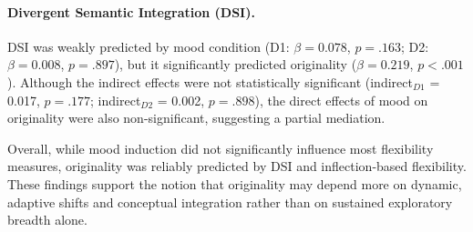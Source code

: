 \documentclass[../MA_Thesis.tex]{subfiles}
\begin{document}
\paragraph{Divergent Semantic Integration (DSI).}
DSI was weakly predicted by mood condition (D1: $\beta = 0.078$, $p = .163$; D2: $\beta = 0.008$, $p = .897$), but it significantly predicted originality ($\beta = 0.219$, $p < .001$). Although the indirect effects were not statistically significant (indirect$_{D1}$ = 0.017, $p = .177$; indirect$_{D2}$ = 0.002, $p = .898$), the direct effects of mood on originality were also non-significant, suggesting a partial mediation.

Overall, while mood induction did not significantly influence most flexibility measures, originality was reliably predicted by DSI and inflection-based flexibility. These findings support the notion that originality may depend more on dynamic, adaptive shifts and conceptual integration rather than on sustained exploratory breadth alone.
\end{document}
